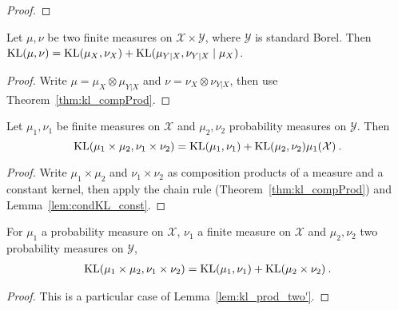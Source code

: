 \begin{proof}%
{}

\end{proof}


\begin{theorem}
  \label{thm:kl_fst_add_condKL}
  \leanok
  Let $\mu, \nu$ be two finite measures on $\mathcal X \times \mathcal Y$, where $\mathcal Y$ is standard Borel.
  Then $\operatorname{KL}(\mu, \nu) = \operatorname{KL}(\mu_X, \nu_X) + \operatorname{KL}(\mu_{Y|X}, \nu_{Y|X} \mid \mu_X)$.
\end{theorem}

\begin{proof} \leanok
{}
Write $\mu = \mu_X \otimes \mu_{Y|X}$ and $\nu = \nu_X \otimes \nu_{Y|X}$, then use Theorem~\ref{thm:kl_compProd}.
\end{proof}

\begin{lemma}
  \label{lem:kl_prod_two'}
  \leanok
  Let $\mu_1, \nu_1$ be finite measures on $\mathcal X$ and $\mu_2, \nu_2$ probability measures on $\mathcal{Y}$. Then
  $$\operatorname{KL}(\mu_1\times \mu_2, \nu_1 \times \nu_2) = \operatorname{KL}(\mu_1, \nu_1) + \operatorname{KL}(\mu_2, \nu_2) \mu_1 (\mathcal X) \: .$$
\end{lemma}

\begin{proof} \leanok
{}
Write $\mu_1 \times \mu_2$ and $\nu_1 \times \nu_2$ as composition products of a measure and a constant kernel, then apply the chain rule (Theorem~\ref{thm:kl_compProd}) and Lemma~\ref{lem:condKL_const}.
\end{proof}
 
\begin{theorem}[Tensorization]
  \label{thm:kl_prod_two}
  \leanok
  For $\mu_1$ a probability measure on $\mathcal X$, $\nu_1$ a finite measure on $\mathcal{X}$ and $\mu_2, \nu_2$ two probability measures on $\mathcal Y$,
  \begin{align*}
  \operatorname{KL}(\mu_1 \times \mu_2, \nu_1 \times \nu_2) = \operatorname{KL}(\mu_1, \nu_1) + \operatorname{KL}(\mu_2 \times \nu_2) \: .
  \end{align*}
\end{theorem}

\begin{proof} \leanok
{}
This is a particular case of Lemma~\ref{lem:kl_prod_two'}.
\end{proof}

